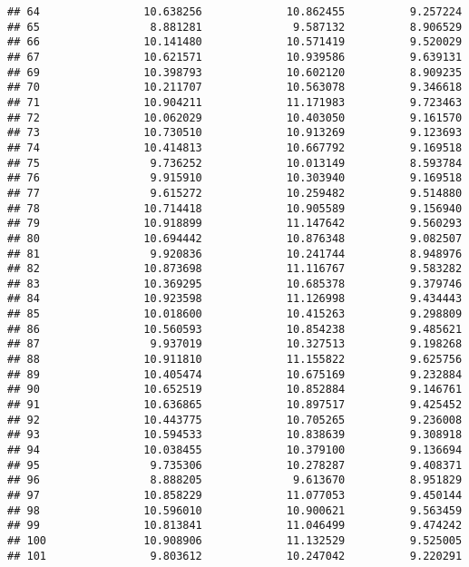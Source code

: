 \documentclass[
]{article}
\begin{document}
\begin{verbatim}
## 64                10.638256             10.862455          9.257224
## 65                 8.881281              9.587132          8.906529
## 66                10.141480             10.571419          9.520029
## 67                10.621571             10.939586          9.639131
## 69                10.398793             10.602120          8.909235
## 70                10.211707             10.563078          9.346618
## 71                10.904211             11.171983          9.723463
## 72                10.062029             10.403050          9.161570
## 73                10.730510             10.913269          9.123693
## 74                10.414813             10.667792          9.169518
## 75                 9.736252             10.013149          8.593784
## 76                 9.915910             10.303940          9.169518
## 77                 9.615272             10.259482          9.514880
## 78                10.714418             10.905589          9.156940
## 79                10.918899             11.147642          9.560293
## 80                10.694442             10.876348          9.082507
## 81                 9.920836             10.241744          8.948976
## 82                10.873698             11.116767          9.583282
## 83                10.369295             10.685378          9.379746
## 84                10.923598             11.126998          9.434443
## 85                10.018600             10.415263          9.298809
## 86                10.560593             10.854238          9.485621
## 87                 9.937019             10.327513          9.198268
## 88                10.911810             11.155822          9.625756
## 89                10.405474             10.675169          9.232884
## 90                10.652519             10.852884          9.146761
## 91                10.636865             10.897517          9.425452
## 92                10.443775             10.705265          9.236008
## 93                10.594533             10.838639          9.308918
## 94                10.038455             10.379100          9.136694
## 95                 9.735306             10.278287          9.408371
## 96                 8.888205              9.613670          8.951829
## 97                10.858229             11.077053          9.450144
## 98                10.596010             10.900621          9.563459
## 99                10.813841             11.046499          9.474242
## 100               10.908906             11.132529          9.525005
## 101                9.803612             10.247042          9.220291

\end{verbatim}
\end{document}
